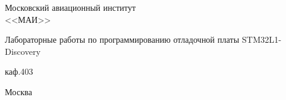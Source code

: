 \newpage
\thispagestyle{empty}

\begin{center}
\begin{Large}
Московский авиационный институт 
\\<<МАИ>>
\end{Large}
\end{center}
\vspace{20em}
\begin{center}
{\huge Лабораторные работы по программированию отладочной платы STM32L1-Discovery}
\end{center}
\begin{center}
каф.403
\end{center}

\vspace{\fill}

\begin{center}
Москва \the\year
\end{center}